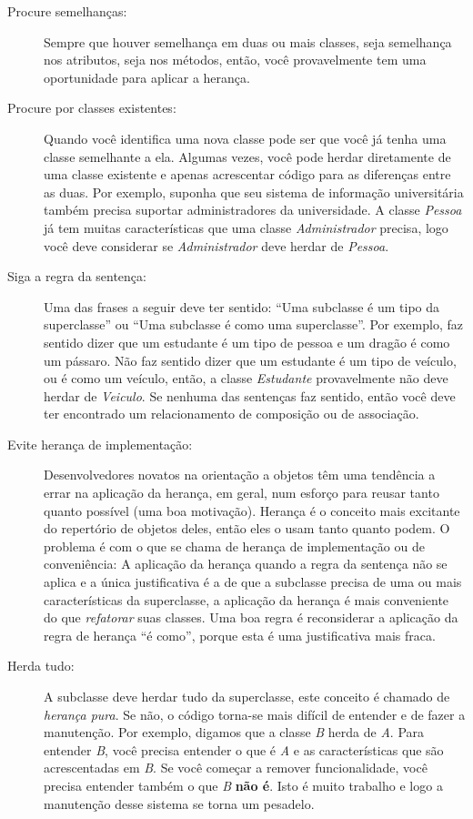 \begin{description}
\item[Procure semelhanças:] Sempre que houver semelhança em duas ou mais classes, seja semelhança nos atributos, seja nos métodos, então, você provavelmente tem uma oportunidade para aplicar a herança.

\item[Procure por classes existentes:] Quando você identifica uma nova classe pode ser que você já tenha uma classe semelhante a ela. Algumas vezes, você pode herdar diretamente de uma classe existente e apenas acrescentar código para as diferenças entre as duas. Por exemplo, suponha que seu sistema de informação universitária também precisa suportar administradores da universidade. A classe \emph{Pessoa} já tem muitas características que uma classe \emph{Administrador} precisa, logo você deve considerar se \emph{Administrador} deve herdar de \emph{Pessoa}.

\item[Siga a regra da sentença:] Uma das frases a seguir deve ter sentido: ``Uma subclasse é um tipo da superclasse'' ou ``Uma subclasse é como uma superclasse''. Por exemplo, faz sentido dizer que um estudante é um tipo de pessoa e um dragão é como um pássaro. Não faz sentido dizer que um estudante é um tipo de veículo, ou é como um veículo, então, a classe \emph{Estudante} provavelmente não deve herdar de \emph{Veiculo}. Se nenhuma das sentenças faz sentido, então você deve ter encontrado um relacionamento de composição ou de associação.

\item[Evite herança de implementação:] Desenvolvedores novatos na orientação a objetos têm uma tendência a errar na aplicação da herança, em geral, num esforço para reusar tanto quanto possível (uma boa motivação). Herança é o conceito mais excitante do repertório de objetos deles, então eles o usam tanto quanto podem. O problema é com o que se chama de herança de implementação ou de conveniência: A aplicação da herança quando a regra da sentença não se aplica e a única justificativa é a de que a subclasse precisa de uma ou mais características da superclasse, a aplicação da herança é mais conveniente do que \textit{refatorar} suas classes. Uma boa regra é reconsiderar a aplicação da regra de herança ``é como'', porque esta é uma justificativa mais fraca.

\item[Herda tudo:] A subclasse deve herdar tudo da superclasse, este conceito é chamado de \emph{herança pura}. Se não, o código torna-se mais difícil de entender e de fazer a manutenção. Por exemplo, digamos que a classe \emph{B} herda de \emph{A}. Para entender \emph{B}, você precisa entender o que é \emph{A} e as características que são acrescentadas em \emph{B}. Se você começar a remover funcionalidade, você precisa entender também o que \emph{B} \textbf{não é}. Isto é muito trabalho e logo a manutenção desse sistema se torna um pesadelo.

\end{description}

